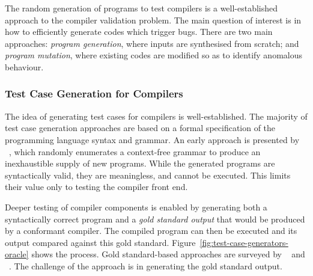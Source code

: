 The random generation of programs to test compilers is a well-established approach to the compiler validation problem. The main question of interest is in how to efficiently generate codes which trigger bugs. There are two main approaches: \emph{program generation}, where inputs are synthesised from scratch; and \emph{program mutation}, where existing codes are modified so as to identify anomalous behaviour.


\subsubsection{Test Case Generation for Compilers}

The idea of generating test cases for compilers is well-established. The majority of test case generation approaches are based on a formal specification of the programming language syntax and grammar.
An early approach is presented by \citeauthor{Hanford1970a}~\cite{Hanford1970a}, which randomly enumerates a context-free grammar to produce an inexhaustible supply of new programs. While the generated programs are syntactically valid, they are meaningless, and cannot be executed. This limits their value only to testing the compiler front end.

Deeper testing of compiler components is enabled by generating both a syntactically correct program and a \emph{gold standard output} that would be produced by a conformant compiler. The compiled program can then be executed and its output compared against this gold standard. Figure~\ref{fig:test-case-generators-oracle} shows the process. Gold standard-based approaches are surveyed by \citeauthor{Boujarwah1997}~\cite{Boujarwah1997} and \citeauthor{Kossatchev2005}~\cite{Kossatchev2005}. The challenge of the approach is in generating the gold standard output.

